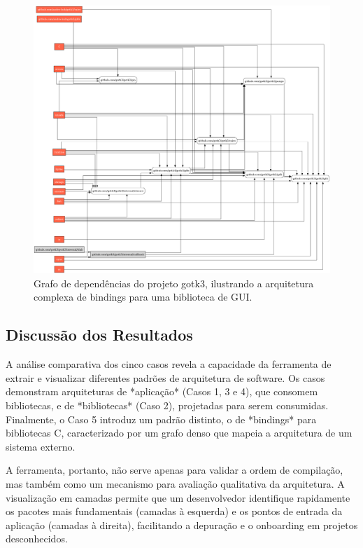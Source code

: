 \documentclass[12pt]{article}
\begin{document}
\begin{figure}[htbp]
\centering
\includegraphics[width=1\textwidth]{examples/gotk3.png}
\caption{Grafo de dependências do projeto gotk3, ilustrando a arquitetura complexa de bindings para uma biblioteca de GUI.}
\label{fig:exemplo-5}
\end{figure}

\FloatBarrier 

\subsection{Discussão dos Resultados}
A análise comparativa dos cinco casos revela a capacidade da ferramenta de extrair e visualizar diferentes padrões de arquitetura de software. Os casos demonstram arquiteturas de *aplicação* (Casos 1, 3 e 4), que consomem bibliotecas, e de *bibliotecas* (Caso 2), projetadas para serem consumidas. Finalmente, o Caso 5 introduz um padrão distinto, o de *bindings* para bibliotecas C, caracterizado por um grafo denso que mapeia a arquitetura de um sistema externo.

A ferramenta, portanto, não serve apenas para validar a ordem de compilação, mas também como um mecanismo para avaliação qualitativa da arquitetura. A visualização em camadas permite que um desenvolvedor identifique rapidamente os pacotes mais fundamentais (camadas à esquerda) e os pontos de entrada da aplicação (camadas à direita), facilitando a depuração e o onboarding em projetos desconhecidos.
\end{document}
